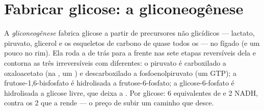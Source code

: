 \section{Fabricar glicose: a gliconeogênese}

\begin{definition}[Gliconeogênese]\label{def:b1:biosyntheses-integration:gluconeogenesis}
A \emph{gliconeogênese} fabrica glicose a partir de precursores não
glicídicos --- lactato, piruvato, glicerol e os esqueletos de carbono de
quase todos os  --- no fígado (e um pouco no rim). Ela roda a
 de trás para a frente nas sete etapas reversíveis dela e
contorna as três irreversíveis com  diferentes: o piruvato é
carboxilado a oxaloacetato (na , um ) e descarboxilado a
fosfoenolpiruvato (um GTP); a frutose-1,6-bisfosfato é hidrolisada a
frutose-6-fosfato; a glicose-6-fosfato é hidrolisada a glicose livre,
que deixa a . Por glicose: 6 equivalentes de  e 2 NADH, contra
os 2  que a  rende --- o preço de subir um caminho que desce.
\end{definition}

